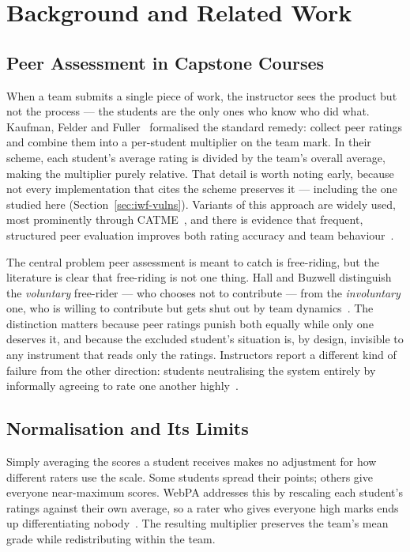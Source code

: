 \chapter{Background and Related Work}
\section{Peer Assessment in Capstone Courses}
\label{sec:peer-assess}

When a team submits a single piece of work, the instructor sees the product but not the process — the students are the only ones who know who did what. Kaufman, Felder and Fuller~\citep{kaufman2000accounting} formalised the standard remedy: collect peer ratings and combine them into a per-student multiplier on the team mark. In their scheme, each student's average rating is divided by the team's overall average, making the multiplier purely relative. That detail is worth noting early, because not every implementation that cites the scheme preserves it — including the one studied here (Section~\ref{sec:iwf-vulns}). Variants of this approach are widely used, most prominently through CATME~\citep{ohland2012catme}, and there is evidence that frequent, structured peer evaluation improves both rating accuracy and team behaviour~\citep{friess2020continuous}.

The central problem peer assessment is meant to catch is free-riding, but the literature is clear that free-riding is not one thing. Hall and Buzwell distinguish the \emph{voluntary} free-rider — who chooses not to contribute — from the \emph{involuntary} one, who is willing to contribute but gets shut out by team dynamics~\citep{hall2013freeriding}. The distinction matters because peer ratings punish both equally while only one deserves it, and because the excluded student's situation is, by design, invisible to any instrument that reads only the ratings. Instructors report a different kind of failure from the other direction: students neutralising the system entirely by informally agreeing to rate one another highly~\citep{hooshangi2025assessment}.

\section{Normalisation and Its Limits}
\label{sec:webpa}

Simply averaging the scores a student receives makes no adjustment for how different raters use the scale. Some students spread their points; others give everyone near-maximum scores. WebPA addresses this by rescaling each student's ratings against their own average, so a rater who gives everyone high marks ends up differentiating nobody~\citep{loddington2009webpa}. The resulting multiplier preserves the team's mean grade while redistributing within the team.


